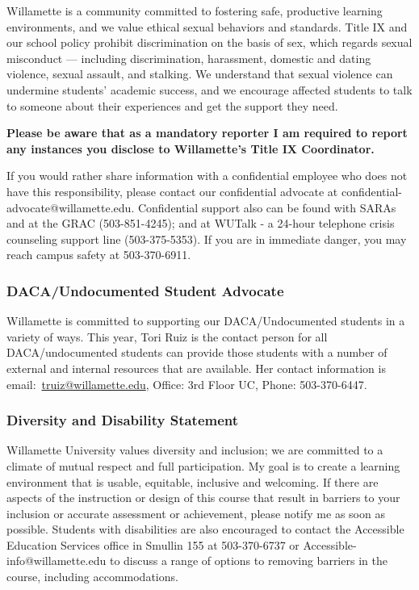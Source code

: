 Willamette is a community committed to fostering safe, productive learning environments, and we value ethical sexual behaviors and standards. Title IX and our school policy prohibit discrimination on the basis of sex, which regards sexual misconduct — including discrimination, harassment, domestic and dating violence, sexual assault, and stalking. We understand that sexual violence can undermine students’ academic success, and we encourage affected students to talk to someone about their experiences and get the support they need. 

\begin{quoting}\textbf{Please be aware that as a mandatory reporter I am required to report any instances you disclose to Willamette's Title IX Coordinator.}\end{quoting}

If you would rather share information with a confidential employee who does not have this responsibility, please contact our confidential advocate at confidential-advocate@willamette.edu. Confidential support also can be found with SARAs and at the GRAC (503-851-4245); and at WUTalk - a 24-hour telephone crisis counseling support line (503-375-5353). If you are in immediate danger, you may reach campus safety at 503-370-6911.

\subsubsection*{DACA/Undocumented Student Advocate}

Willamette is committed to supporting our DACA/Undocumented students in a variety of ways. This year, Tori Ruiz is the contact person for all DACA/undocumented students can provide those students with a number of external and internal resources that are available. Her contact information is email:~\href{mailto:truiz@willamette.edu}{truiz@willamette.edu}, Office: 3rd Floor UC, Phone: 503-370-6447.

\subsubsection*{Diversity and Disability Statement}

Willamette University values diversity and inclusion; we are committed to a climate of mutual respect and full participation. My goal is to create a learning environment that is usable, equitable, inclusive and welcoming. If there are aspects of the instruction or design of this course that result in barriers to your inclusion or accurate assessment or achievement, please notify me as soon as possible. Students with disabilities are also encouraged to contact the Accessible Education Services office in Smullin 155 at 503-370-6737 or Accessible-info@willamette.edu to discuss a range of options to removing barriers in the course, including accommodations.

